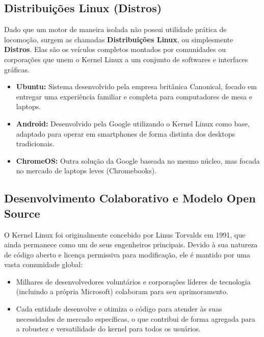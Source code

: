 \documentclass{article}
\begin{document}
\subsection{Distribuições Linux (Distros)}
Dado que um motor de maneira isolada não possui utilidade prática de locomoção, surgem as chamadas \textbf{Distribuições Linux}, ou simplesmente \textbf{Distros}. Elas são os veículos completos montados por comunidades ou corporações que unem o Kernel Linux a um conjunto de softwares e interfaces gráficas.
\begin{itemize}
    \item \textbf{Ubuntu:} Sistema desenvolvido pela empresa britânica Canonical, focado em entregar uma experiência familiar e completa para computadores de mesa e laptops.
    \item \textbf{Android:} Desenvolvido pela Google utilizando o Kernel Linux como base, adaptado para operar em smartphones de forma distinta dos desktops tradicionais.
    \item \textbf{ChromeOS:} Outra solução da Google baseada no mesmo núcleo, mas focada no mercado de laptops leves (Chromebooks).
\end{itemize}

\subsection{Desenvolvimento Colaborativo e Modelo Open Source}
O Kernel Linux foi originalmente concebido por Linus Torvalds em 1991, que ainda permanece como um de seus engenheiros principais. Devido à sua natureza de código aberto e licença permissiva para modificação, ele é mantido por uma vasta comunidade global:
\begin{itemize}
    \item Milhares de desenvolvedores voluntários e corporações líderes de tecnologia (incluindo a própria Microsoft) colaboram para seu aprimoramento.
    \item Cada entidade desenvolve e otimiza o código para atender às suas necessidades de mercado específicas, o que contribui de forma agregada para a robustez e versatilidade do kernel para todos os usuários.
\end{itemize}
\end{document}
